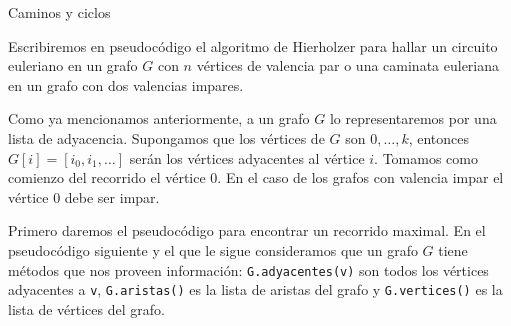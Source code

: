 \begin{section}{Caminos y ciclos}
\begin{comment}
\vskip .4cm
{%
\begin{minipage}{0.95\textwidth}
\noindent \textsc{Circuito euleriano}
\vskip .2cm
\begin{small}
\begin{verbatim}
# pre: G grafo con todos los vértices de valencia par 
# post: cuando termina 'circuito' es una lista de vértices que es
#       un circuito euleriano que empieza en 0 (y termina en 0).
circuito = [0]  # inicio de la caminata
libres = G # aristas no utilizadas
while nº de aristas(libres) > 0:
    sub_caminata = []   
    h = 0
    while libres[h] == [] or h not in circuito:
        h = h + 1
    # h = vértice en circuito y libre[h] != [] (hay aristas libres)
    pos = circuito.index(h) # posición de la 1º ocurrencia de h
    p0 = h
    p1 = libres[h][0] 
    while p1 != h: # mientras no se vuelva al origen
        sub_caminata.append(p1)  # agrega p1 a sub_caminata 
        libres.remover({p0,p1}) # quitar arista p0, p1 
        p0 = p1 
        p1 = libres[p0][0]
    libres.remover({p0, P1}) # quitar arista p0, p1 = h 
    circuito = circuito[:pos+1] + sub_caminata + circuito[pos:]
\end{verbatim}
\end{small}
\end{minipage}
}


\vskip .4cm
En todo  el programa \texttt{libres} es una lista de adyacencia que nos va dando las aristas no utilizadas. 
Es decir si $w$ es un vértice \texttt{libres[w]} es una lista de los vértices $u$ tal que la arista $wu$ no ha sido utilizada. 
\end{observacion*}
\end{comment}

\begin{observacion*} Escribiremos en pseudocódigo el algoritmo de Hierholzer para hallar un circuito euleriano en un grafo $G$ con $n$ vértices  de valencia par o una caminata euleriana en un grafo con dos valencias impares.
    
Como ya mencionamos anteriormente, a un grafo $G$ lo representaremos por una lista de adyacencia. Supongamos que los vértices de $G$ son $0,\ldots,k$,  entonces $G[i] = [i_0,i_1,\ldots]$ serán los vértices adyacentes al vértice $i$. Tomamos como comienzo del recorrido el vértice  $0$. En  el caso de los grafos con valencia impar el vértice $0$ debe ser impar. 

Primero daremos el pseudocódigo para encontrar un recorrido maximal. En el pseudocódigo siguiente y el que le sigue consideramos que un grafo $G$ tiene métodos que nos proveen información:  \verb+G.adyacentes(v)+ son todos los vértices adyacentes a  \verb+v+, \verb+G.aristas()+ es la lista de aristas del grafo y \verb+G.vertices()+ es la lista de vértices del grafo.


\end{observacion*}
\end{section}
